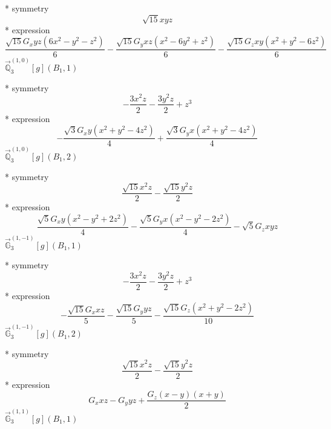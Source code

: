 \documentclass[fleqn,8pt]{jsarticle}
\begin{document}
\noindent\quad ** symmetry
\begin{dmath*}
\sqrt{15} x y z
\end{dmath*}
\noindent\quad ** expression
\begin{dmath*}
\frac{\sqrt{15} G_{x} y z \left(6 x^{2} - y^{2} - z^{2}\right)}{6} - \frac{\sqrt{15} G_{y} x z \left(x^{2} - 6 y^{2} + z^{2}\right)}{6} - \frac{\sqrt{15} G_{z} x y \left(x^{2} + y^{2} - 6 z^{2}\right)}{6}
\end{dmath*}
\noindent\quad $\vec{\mathbb{Q}}_{3}^{(1,0)}[g](B_{1},1)$

\noindent\quad ** symmetry
\begin{dmath*}
- \frac{3 x^{2} z}{2} - \frac{3 y^{2} z}{2} + z^{3}
\end{dmath*}
\noindent\quad ** expression
\begin{dmath*}
- \frac{\sqrt{3} G_{x} y \left(x^{2} + y^{2} - 4 z^{2}\right)}{4} + \frac{\sqrt{3} G_{y} x \left(x^{2} + y^{2} - 4 z^{2}\right)}{4}
\end{dmath*}
\noindent\quad $\vec{\mathbb{Q}}_{3}^{(1,0)}[g](B_{1},2)$

\noindent\quad ** symmetry
\begin{dmath*}
\frac{\sqrt{15} x^{2} z}{2} - \frac{\sqrt{15} y^{2} z}{2}
\end{dmath*}
\noindent\quad ** expression
\begin{dmath*}
\frac{\sqrt{5} G_{x} y \left(x^{2} - y^{2} + 2 z^{2}\right)}{4} - \frac{\sqrt{5} G_{y} x \left(x^{2} - y^{2} - 2 z^{2}\right)}{4} - \sqrt{5} G_{z} x y z
\end{dmath*}
\noindent\quad $\vec{\mathbb{G}}_{3}^{(1,-1)}[g](B_{1},1)$

\noindent\quad ** symmetry
\begin{dmath*}
- \frac{3 x^{2} z}{2} - \frac{3 y^{2} z}{2} + z^{3}
\end{dmath*}
\noindent\quad ** expression
\begin{dmath*}
- \frac{\sqrt{15} G_{x} x z}{5} - \frac{\sqrt{15} G_{y} y z}{5} - \frac{\sqrt{15} G_{z} \left(x^{2} + y^{2} - 2 z^{2}\right)}{10}
\end{dmath*}
\noindent\quad $\vec{\mathbb{G}}_{3}^{(1,-1)}[g](B_{1},2)$

\noindent\quad ** symmetry
\begin{dmath*}
\frac{\sqrt{15} x^{2} z}{2} - \frac{\sqrt{15} y^{2} z}{2}
\end{dmath*}
\noindent\quad ** expression
\begin{dmath*}
G_{x} x z - G_{y} y z + \frac{G_{z} \left(x - y\right) \left(x + y\right)}{2}
\end{dmath*}
\noindent\quad $\vec{\mathbb{G}}_{3}^{(1,1)}[g](B_{1},1)$
\end{document}
